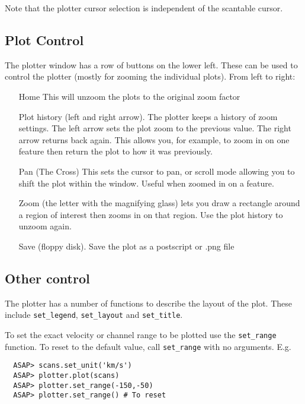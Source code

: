 \documentclass[11pt]{article}
\newcommand{\cmd}[1]{{\tt #1}}
\begin{document}
Note that the plotter cursor selection is independent of the scantable
cursor.

\subsection{Plot Control}

The plotter window has a row of buttons on the lower left. These can
be used to control the plotter (mostly for zooming the individual
plots). From left to right:

\begin{itemize}

\item[Home] This will unzoom the plots to the original zoom factor

\item[Plot history] (left and right arrow). The plotter keeps a
history of zoom settings. The left arrow sets the plot zoom to the
previous value. The right arrow returns back again. This allows you,
for example, to zoom in on one feature then return the plot to how it
was previously.

\item[Pan] (The Cross) This sets the cursor to pan, or scroll mode
       allowing you to shift the plot within the window. Useful when
       zoomed in on a feature.

\item[Zoom] (the letter with the magnifying glass) lets you draw a
       rectangle around a region of interest then zooms in on that
       region. Use the plot history to unzoom again.

\item[Save] (floppy disk). Save the plot as a postscript or .png file

\end{itemize}

\subsection{Other control}

The plotter has a number of functions to describe the layout of the
plot. These include \cmd{set\_legend}, \cmd{set\_layout} and \cmd{set\_title}.

To set the exact velocity or channel range to be plotted use the
\cmd{set\_range} function. To reset to the default value, call
\cmd{set\_range} with no arguments. E.g.

\begin{verbatim}
  ASAP> scans.set_unit('km/s')
  ASAP> plotter.plot(scans)
  ASAP> plotter.set_range(-150,-50)
  ASAP> plotter.set_range() # To reset
\end{verbatim}
\end{document}
